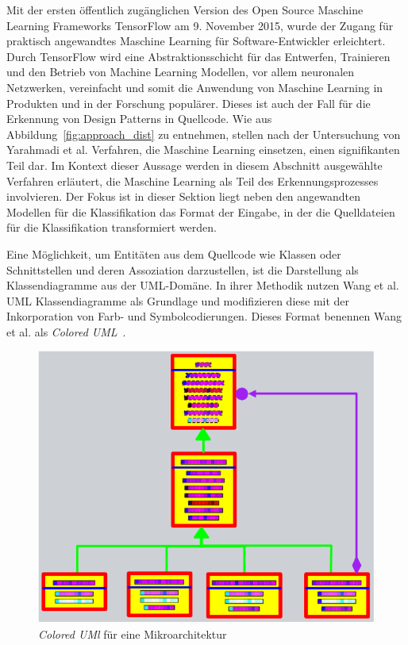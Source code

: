 Mit der ersten öffentlich zugänglichen Version des Open Source Maschine Learning Frameworks TensorFlow am 9. November 2015, wurde der Zugang für praktisch angewandtes Maschine Learning
für Software-Entwickler erleichtert. Durch TensorFlow wird eine Abstraktionsschicht für das Entwerfen, Trainieren und den Betrieb von Machine Learning Modellen, vor allem neuronalen Netzwerken, vereinfacht
und somit die Anwendung von Maschine Learning in Produkten und in der Forschung populärer. Dieses ist auch der Fall für die Erkennung von Design Patterns in Quellcode.
Wie aus Abbildung~\ref{fig:approach_dist} zu entnehmen, stellen nach der Untersuchung von Yarahmadi et al. Verfahren, die Maschine Learning einsetzen, einen signifikanten Teil dar.
Im Kontext dieser Aussage werden in diesem Abschnitt ausgewählte Verfahren erläutert, die Maschine Learning als Teil des Erkennungsprozesses involvieren.
Der Fokus ist in dieser Sektion liegt neben den angewandten Modellen für die Klassifikation das Format der Eingabe, in der die Quelldateien für die Klassifikation transformiert werden.

Eine Möglichkeit, um Entitäten aus dem Quellcode wie Klassen oder Schnittstellen und deren Assoziation darzustellen, ist die Darstellung als Klassendiagramme aus der UML-Domäne.
In ihrer Methodik nutzen Wang et al. UML Klassendiagramme als Grundlage und modifizieren diese mit der Inkorporation von Farb- und Symbolcodierungen. Dieses Format benennen Wang et al. als \textit{Colored UML}~\cite[S. 6]{app12178718}.

\begin{figure}[h]
    \centering
    \includegraphics[scale=0.75]{figures/colored_uml.png}
    \caption{\textit{Colored UMl} für eine Mikroarchitektur}
    \label{fig:colored_uml}
\end{figure}

